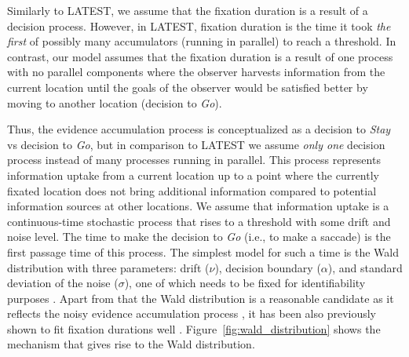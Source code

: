 \documentclass{article}
\begin{document}
Similarly to LATEST, we assume that the fixation duration is a result of a decision process. However, in LATEST, fixation duration is the time it took \textit{the first} of possibly many accumulators (running in parallel) to reach a threshold. In contrast, our model assumes that the fixation duration is a result of one process with no parallel components where the observer harvests information from the current location until the goals of the observer would be satisfied better by moving to another location (decision to \textit{Go}).

Thus, the evidence accumulation process is conceptualized as a decision to \textit{Stay} vs decision to \textit{Go}, but in comparison to LATEST we assume \textit{only one} decision process instead of many processes running in parallel. This process represents information uptake from a current location up to a point where the currently fixated location does not bring additional information compared to potential information sources at other locations. We assume that information uptake is a continuous-time stochastic process that rises to a threshold with some drift and noise level. The time to make the decision to \textit{Go} (i.e., to make a saccade) is the first passage time of this process. The simplest model for such a time is the Wald distribution with three parameters: drift ($\nu$), decision boundary ($\alpha$), and standard deviation of the noise ($\sigma$), one of which needs to be fixed for identifiability purposes \citep{chhikara1988inverse}. Apart from that the Wald distribution is a reasonable candidate as it reflects the noisy evidence accumulation process \citep[a process that has been deemed as a neurally plausible mechanism for decision processes, ][]{anders2016shifted}, it has been also previously shown to fit fixation durations well \citep{palmer2011shapes}. Figure~\ref{fig:wald_distribution} shows the mechanism that gives rise to the Wald distribution.
\end{document}

